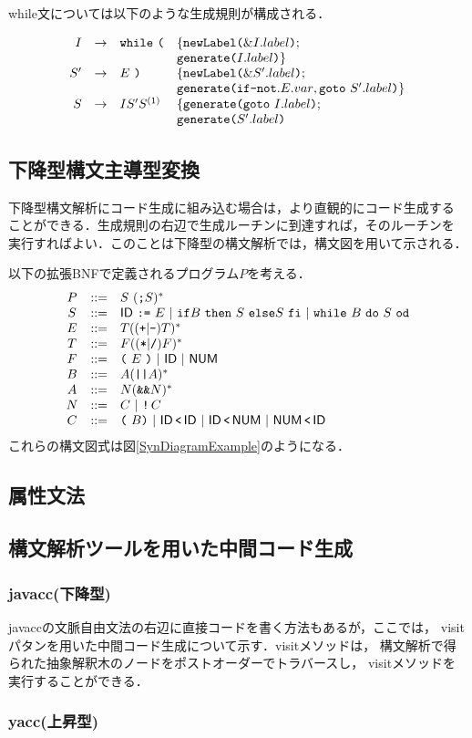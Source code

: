 \documentclass[dvipdfmx,a4j]{jbook}
\begin{document}
while文については以下のような生成規則が構成される．

 \[\begin{array}{rcll}
  I & \rightarrow & \texttt{while}\ \texttt{(} & \{\texttt{newLabel(}\& I.label\texttt{)};\\
    & & & \texttt{generate(}{I.label}\texttt{)}\}\\
  S' & \rightarrow & E\ \texttt{)} & \{\texttt{newLabel(}\& S'.label\texttt{)};\\
    & & & \texttt{generate(}{\texttt{if-not}}.{E.var},{\texttt{goto}\ S'.label}\texttt{)}\}\\
  S & \rightarrow & IS'S^{(1)} & \{\texttt{generate(}{\texttt{goto}\ I.label}\texttt{)};\\
    & & & \texttt{generate(}{S'.label}\texttt{)}
 \end{array}\]

\subsection{下降型構文主導型変換}

下降型構文解析にコード生成に組み込む場合は，より直観的にコード生成する
ことができる．生成規則の右辺で生成ルーチンに到達すれば，そのルーチンを
実行すればよい．このことは下降型の構文解析では，構文図を用いて示される．

\begin{Exmp}
  以下の拡張BNFで定義されるプログラム$P$を考える．
\[\begin{array}{crl}
  P & ::= & S\ (\ttsc S)^\ast\\
  S & ::= & \mathsf{ID}\ \ttassgn\ E\ |\ \ttif B\ \ttthen\ S\ \ttelse S\ \ttfi\ |\ \ttwhile\ B\ \ttdo\ S\ \ttod\\
  E & ::= & T((\ttpl|\ttsb)T)^\ast\\
  T & ::= & F((\ttmu|\ttdv)F)^\ast\\
  F & ::= & \ttlp\ E\ \ttrp\ |\ \mathsf{ID}\ |\ \mathsf{NUM}\\
  B & ::= & A(\ttor A)^\ast\\
  A & ::= & N(\ttand N)^\ast\\
  N & ::= & C\ |\ \ttneg\,C\\
  C & ::= & \ttlp\ B\ttrp\ |\ \mathsf{ID}\,\ttlt\,\mathsf{ID}\ |\ \mathsf{ID}\,\ttlt\,\mathsf{NUM}\ |\ \mathsf{NUM}\,\ttlt\,\mathsf{ID}
\end{array}\]
これらの構文図式は図\ref{SynDiagramExample}のようになる．
\end{Exmp}
\subsection{属性文法}

\subsection{構文解析ツールを用いた中間コード生成}
\subsubsection{javacc(下降型)}

javaccの文脈自由文法の右辺に直接コードを書く方法もあるが，ここでは，
visitパタンを用いた中間コード生成について示す．visitメソッドは，
構文解析で得られた抽象解釈木のノードをポストオーダーでトラバースし，
visitメソッドを実行することができる．

\subsubsection{yacc(上昇型)}
\end{document}
